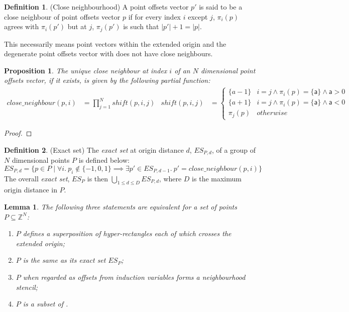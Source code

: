 \documentclass[acmlarge,review]{acmart}
\theoremstyle{definition}
\newtheorem{defn}{Definition}
\theoremstyle{plain}
\newtheorem{lem}{Lemma}
\newtheorem{prop}{Proposition}
\theoremstyle{remark}
\begin{document}
\begin{defn}{(Close neighbourhood)}
  A point offsets vector $p'$ is said to be a close neighbour of point offsets
  vector $p$ if for every index $i$ except $j$, $\pi_i(p)$ agrees with
  $\pi_i(p')$ but at $j$, $\pi_j(p')$ is such that $|p'| + 1 = |p|$.

  This necessarily means point vectors within the extended origin and the
  degenerate point offsets vector with \interv{-\infty}{\infty}{} does not have
  close neighbours.
\end{defn}
%
\begin{prop}
  The unique close neighbour at index $i$ of an $N$ dimensional point offsets
  vector, if it exists, is given by the following partial function:
%
  \begin{align*}
    \mathit{close\_neighbour}(p,i) & = \prod^{N}_{j=1} \mathit{shift}(p,i,j) &
%
    \mathit{shift}(p,i,j) & =
      \begin{cases}
        \{a - 1\} & i = j \wedge \pi_i(p) = \{\mathsf{a}\} \wedge \mathsf{a} > 0\\
        \{a + 1\} & i = j \wedge \pi_i(p) = \{\mathsf{a}\} \wedge \mathsf{a} < 0\\
        \pi_j(p)  & otherwise
      \end{cases}
  \end{align*}
\end{prop}
%
\begin{proof}
\end{proof}

\begin{defn}{(Exact set)}
  The \emph{exact set} at origin distance $d$, $\mathit{ES}_{P,d}$, of a group
  of $N$ dimensional points $P$ is defined below:
%
  \begin{equation*}
    \mathit{ES}_{P,d} =
      \{ p \in P \mid \forall i.\
         p_i \notin \{-1,0,1\} \implies
         \exists p' \in \mathit{ES}_{P,d-1}.\ p' =
         \mathit{close\_neighbour}(p,i) \}
  \end{equation*}
%
  The overall \emph{exact set}, $\mathit{ES}_P$ is then
  $\bigcup_{1 \leq d \leq D} \mathit{ES}_{P,d}$, where $D$ is the maximum origin
  distance in $P$.
\end{defn}

\begin{lem}
  The following three statements are equivalent for a set of points $P \subseteq
  \mathbb{Z}^N$:
%
  \begin{enumerate}
    \item $P$ defines a superposition of hyper-rectangles each of which crosses
      the extended origin;
    \item $P$ is the same as its exact set $\mathit{ES}_P$;
    \item $P$ when regarded as offsets from induction variables forms a
      neighbourhood stencil;
    \item $P$ is a subset of .
  \end{enumerate}
\end{lem}
\end{document}
